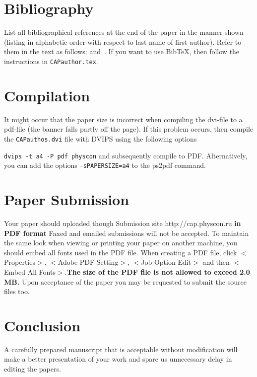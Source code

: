 \documentclass[twocolumn]{CAP-journal}
\begin{document}
\section{Bibliography}
List all bibliographical references at the end of the paper in the
manner shown (listing in alphabetic order with respect to last
name of first author). Refer to them in the text as follows:
\cite{Wang} and~\cite{Paul,Sato}. If you want to use BibTeX, then
follow the instructions in \verb+CAPauthor.tex+.

\section{Compilation}
It might occur that the paper size is incorrect when compiling the
dvi-file to a pdf-file (the banner falls partly off the page). If
this problem occurs, then compile the \verb+CAPauthos.dvi+ file
with DVIPS using the following options

\verb+dvips -t a4 -P pdf physcon+ and subsequently compile to PDF.
Alternatively, you can add the options \verb+-sPAPERSIZE=a4+ to
the ps2pdf command.



\section{Paper Submission}
Your paper should uploaded though Submission site
http://cap.physcon.ru \textbf{in PDF format}
  Faxed and emailed submissions will not be accepted. To
maintain the same look when viewing or printing your paper on
another machine, you should embed all fonts used in the PDF file.
When creating a PDF file, click $<$Properties$>$, $<$Adobe PDF
Setting$>$, $<$Job Option Edit$>$ and then $<$Embed All
Fonts$>$.\textbf{The size of the PDF file is not allowed to exceed
2.0 MB.} Upon acceptance of the paper you may be requested to submit 
the source files too.


\section{Conclusion}
A carefully prepared manuscript that is acceptable without modification will make a better presentation of your work
and spare us unnecessary delay in editing the papers.
\end{document}
